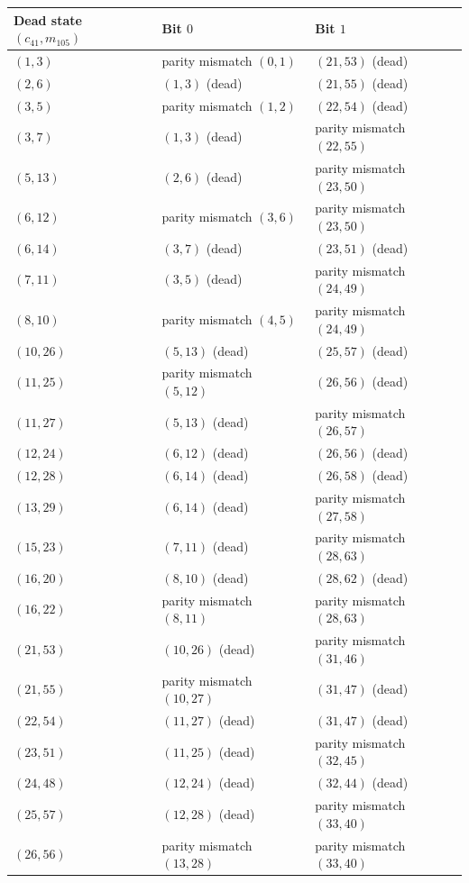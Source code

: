 \documentclass[11pt]{article}
\begin{document}
\begin{table}[ht]
\centering
\small
\begin{tabular}{lll}
\hline
Dead state $(c_{41}, m_{105})$ & Bit $0$ & Bit $1$ \\
\hline
$(1,3)$ & parity mismatch $(0,1)$ & $(21,53)$ (dead) \\
$(2,6)$ & $(1,3)$ (dead) & $(21,55)$ (dead) \\
$(3,5)$ & parity mismatch $(1,2)$ & $(22,54)$ (dead) \\
$(3,7)$ & $(1,3)$ (dead) & parity mismatch $(22,55)$ \\
$(5,13)$ & $(2,6)$ (dead) & parity mismatch $(23,50)$ \\
$(6,12)$ & parity mismatch $(3,6)$ & parity mismatch $(23,50)$ \\
$(6,14)$ & $(3,7)$ (dead) & $(23,51)$ (dead) \\
$(7,11)$ & $(3,5)$ (dead) & parity mismatch $(24,49)$ \\
$(8,10)$ & parity mismatch $(4,5)$ & parity mismatch $(24,49)$ \\
$(10,26)$ & $(5,13)$ (dead) & $(25,57)$ (dead) \\
$(11,25)$ & parity mismatch $(5,12)$ & $(26,56)$ (dead) \\
$(11,27)$ & $(5,13)$ (dead) & parity mismatch $(26,57)$ \\
$(12,24)$ & $(6,12)$ (dead) & $(26,56)$ (dead) \\
$(12,28)$ & $(6,14)$ (dead) & $(26,58)$ (dead) \\
$(13,29)$ & $(6,14)$ (dead) & parity mismatch $(27,58)$ \\
$(15,23)$ & $(7,11)$ (dead) & parity mismatch $(28,63)$ \\
$(16,20)$ & $(8,10)$ (dead) & $(28,62)$ (dead) \\
$(16,22)$ & parity mismatch $(8,11)$ & parity mismatch $(28,63)$ \\
$(21,53)$ & $(10,26)$ (dead) & parity mismatch $(31,46)$ \\
$(21,55)$ & parity mismatch $(10,27)$ & $(31,47)$ (dead) \\
$(22,54)$ & $(11,27)$ (dead) & $(31,47)$ (dead) \\
$(23,51)$ & $(11,25)$ (dead) & parity mismatch $(32,45)$ \\
$(24,48)$ & $(12,24)$ (dead) & $(32,44)$ (dead) \\
$(25,57)$ & $(12,28)$ (dead) & parity mismatch $(33,40)$ \\
$(26,56)$ & parity mismatch $(13,28)$ & parity mismatch $(33,40)$ \\

\end{tabular}
\end{table}
\end{document}

